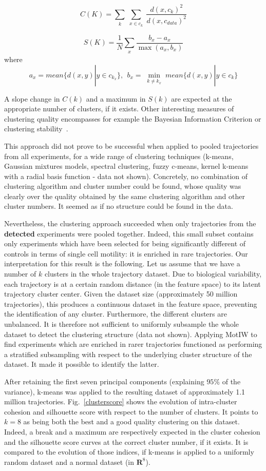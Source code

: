 \[
C(K) = \sum_{\substack{k}} \sum_{\substack{x \in c_k}} \dfrac{d(x, c_k)^2}{d(x, c_{data})^2}\]

\[
S(K) = \dfrac{1}{N} \sum_{\substack{x}} \dfrac{b_x-a_x}{\max (a_x, b_x)}\]
where \[ a_x = mean \{d(x,y) | y \in c_{k_x} \},\ \ b_x = \min_{\substack{k\neq k_x}} mean \{d(x,y) | y \in c_k \}
\]

A slope change in $C(k)$ and a maximum in $S(k)$ are expected at the appropriate number of clusters, if it exists. Other interesting measures of clustering quality encompasses for example the Bayesian Information Criterion or clustering stability~\cite{pmid11928511}.

This approach did not prove to be successful when applied to pooled trajectories from all experiments, for a wide range of clustering techniques (k-means, Gaussian mixtures models, spectral clustering, fuzzy c-means, kernel k-means with a radial basis function - data not shown). Concretely, no combination of clustering algorithm and cluster number could be found, whose quality was clearly over the quality obtained by the same clustering algorithm and other cluster numbers. It seemed as if no structure could be found in the data.

Nevertheless, the clustering approach succeeded when only trajectories from the \textbf{detected} experiments were pooled together. Indeed, this small subset contains only experiments which have been selected for being significantly different of controls in terms of single cell motility: it is enriched in rare trajectories. Our interpretation for this result is the following. Let us assume that we have a number of $k$ clusters in the whole trajectory dataset. Due to biological variability, each trajectory is at a certain random distance (in the feature space) to its latent trajectory cluster center. Given the dataset size (approximately 50 million trajectories), this produces a continuous dataset in the feature space, preventing the identification of any cluster. Furthermore, the different clusters are unbalanced. It is therefore not sufficient to uniformly subsample the whole dataset to detect the clustering structure (data not shown). Applying MotIW to find experiments which are enriched in rarer trajectories functioned as performing a stratified subsampling with respect to the underlying cluster structure of the dataset. It made it possible to identify the latter.

 After retaining the first seven principal components (explaining $95\%$ of the variance), k-means was applied to the resulting dataset of approximately 1.1 million trajectories. Fig.~\ref{clusterscore} shows the evolution of intra-cluster cohesion and silhouette score with respect to the number of clusters. It points to $k=8$ as being both the best and a good quality clustering on this dataset. Indeed, a break and a maximum are respectively expected in the cluster cohesion and the silhouette score curves at the correct cluster number, if it exists. It is compared to the evolution of those indices, if k-means is applied to a uniformly random dataset and a normal dataset (in $\mathbf{R}^8$). 

